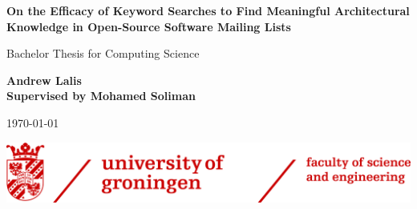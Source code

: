 \begin{titlepage}
	\headingfont
	\begin{center}
		\LARGE \textbf{On the Efficacy of Keyword Searches to Find Meaningful Architectural Knowledge in Open-Source Software Mailing Lists}
		
		\vspace{0.5cm}
		
		\Large
		Bachelor Thesis for Computing Science
		
		\vspace{2cm}
		
		\textbf{Andrew Lalis} \\
		\normalsize
		\textbf{Supervised by Mohamed Soliman}
		
		\vspace{1cm}
		
		\small
		\normalfont
		\today
		
		\vfill
		
		\includegraphics[width=\textwidth]{img/rug_fse_logo.png}
	\end{center}

	\normalfont
	\normalsize
\end{titlepage}